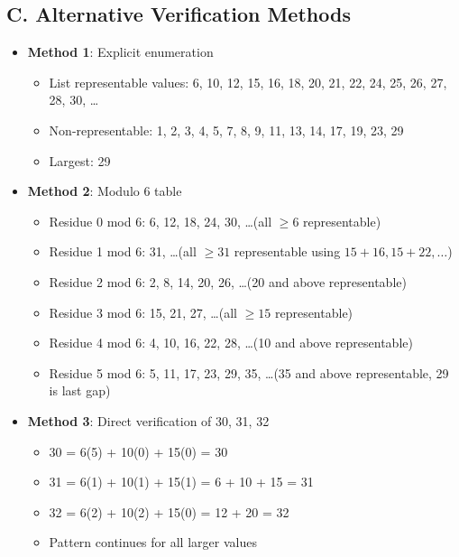 \documentclass[12pt]{article}
\begin{document}
\begin{verificationbox}
\subsection*{C. Alternative Verification Methods}
\begin{itemize}[leftmargin=*]
    \item \textbf{Method 1}: Explicit enumeration
    \begin{itemize}
        \item List representable values: 6, 10, 12, 15, 16, 18, 20, 21, 22, 24, 25, 26, 27, 28, 30, \ldots
        \item Non-representable: 1, 2, 3, 4, 5, 7, 8, 9, 11, 13, 14, 17, 19, 23, 29
        \item Largest: 29
    \end{itemize}
    \item \textbf{Method 2}: Modulo 6 table
    \begin{itemize}
        \item Residue 0 mod 6: 6, 12, 18, 24, 30, \ldots (all $\geq 6$ representable)
        \item Residue 1 mod 6: 31, \ldots (all $\geq 31$ representable using $15 + 16, 15 + 22, \ldots$)
        \item Residue 2 mod 6: 2, 8, 14, 20, 26, \ldots (20 and above representable)
        \item Residue 3 mod 6: 15, 21, 27, \ldots (all $\geq 15$ representable)
        \item Residue 4 mod 6: 4, 10, 16, 22, 28, \ldots (10 and above representable)
        \item Residue 5 mod 6: 5, 11, 17, 23, 29, 35, \ldots (35 and above representable, 29 is last gap)
    \end{itemize}
    \item \textbf{Method 3}: Direct verification of 30, 31, 32
    \begin{itemize}
        \item 30 = 6(5) + 10(0) + 15(0) = 30 \checkmark
        \item 31 = 6(1) + 10(1) + 15(1) = 6 + 10 + 15 = 31 \checkmark
        \item 32 = 6(2) + 10(2) + 15(0) = 12 + 20 = 32 \checkmark
        \item Pattern continues for all larger values
    \end{itemize}
\end{itemize}
\end{verificationbox}
\end{document}
